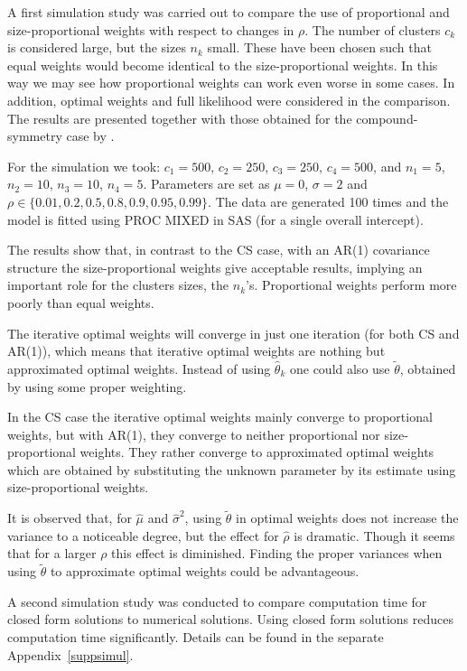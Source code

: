 \documentclass[11pt,a5paper,twoside]{book}
\begin{document}
A first simulation study was carried out to compare the use of proportional and size-proportional weights with respect to changes in $\rho$. The number of clusters $c_k$ is considered large, but the sizes $n_k$ small. These have been chosen such that equal weights would become identical to the size-proportional weights. In this way we may see how proportional weights can work even worse in some cases. In addition, optimal weights and full likelihood were considered in the comparison. The results are presented together with those obtained for
the compound-symmetry case by \cite{hermans2017_cs}.

For the simulation we took: $c_1=500$,  $c_2=250$, $c_3=250$, $c_4= 500$, and $n_1=5$, $n_2= 10$, $n_3= 10$, $n_4=  5$. Parameters are set as $\mu=0$, $\sigma=2$ and $\rho\in\{0.01,0.2,0.5,0.8,0.9,0.95,0.99\}$. The data are generated 100 times and the model is fitted using PROC MIXED in SAS (for a single overall intercept).

The results show that, in contrast to the CS case, with an AR(1) covariance structure the
size-proportional weights give acceptable results, implying an important role for the
clusters sizes, the $n_k$'s. Proportional weights perform more poorly than equal weights.

The iterative optimal weights will converge in just one iteration (for both CS and AR(1)), which means that iterative optimal weights are nothing but approximated optimal weights. Instead of using $\widehat{\theta}_k$ one could also use $\tilde{\theta}$, obtained by using some proper weighting.

In the CS case the iterative optimal weights mainly converge to proportional weights, but with AR(1), they converge to neither proportional nor size-proportional weights. They rather converge to approximated optimal weights which are obtained by substituting the unknown parameter by its estimate using size-proportional weights.

It is observed that, for $\widehat{\mu}$ and $\widehat{\sigma}^2$, using $\tilde{\theta}$ in optimal weights does not increase the variance to a noticeable degree, but the effect for $\widehat{\rho}$ is dramatic. Though it seems that for a larger $\rho$ this effect is diminished. Finding the proper variances when using $\tilde{\theta}$ to approximate optimal weights could be advantageous.

A second simulation study was conducted to compare computation time for closed form solutions to numerical solutions. Using closed form solutions reduces computation time significantly. 
Details can be found in the separate Appendix~\ref{suppsimul}.
\end{document}

